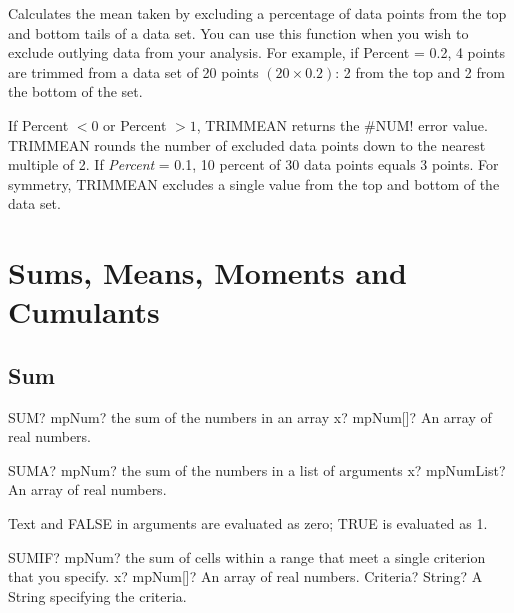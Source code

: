 Calculates the mean taken by excluding a percentage of data points from the top and bottom tails of a data set. You can use this function when you wish to exclude outlying data from your analysis. For example, if \textsf{Percent} = 0.2, 4 points are trimmed from a data set of 20 points $(20 \times 0.2)$: 2 from the top and 2 from the bottom of the set.

\vspace{0.3cm}
If \textsf{Percent} $< 0$ or \textsf{Percent} $> 1$, \textsf{TRIMMEAN} returns the \#NUM! error value.
\textsf{TRIMMEAN} rounds the number of excluded data points down to the nearest multiple of 2. If \textsf{\textsl{Percent}} = 0.1, 10 percent of 30 data points equals 3 points. For symmetry, \textsf{TRIMMEAN} excludes a single value from the top and bottom of the data set.







\newpage
\section{Sums, Means, Moments and Cumulants}
\label{MomentsAndCumulants}

\subsection{Sum}

\begin{mpFunctionsExtract}
	\mpWorksheetFunctionOneNotImplemented
	{SUM? mpNum? the sum of the numbers in an array}
	{x? mpNum[]? An array of real numbers.}
\end{mpFunctionsExtract}


\vspace{0.6cm}
\begin{mpFunctionsExtract}
	\mpWorksheetFunctionOneNotImplemented
	{SUMA? mpNum? the sum of the numbers in a list of arguments}
	{x? mpNumList? An array of real numbers.}
\end{mpFunctionsExtract}

\vspace{0.3cm}
Text and FALSE in arguments are evaluated as zero; TRUE is evaluated as 1.


\vspace{0.6cm}
\begin{mpFunctionsExtract}
	\mpWorksheetFunctionTwoNotImplemented
	{SUMIF? mpNum? the sum of cells within a range that meet a single criterion that you specify.}
	{x? mpNum[]? An array of real numbers.}
	{Criteria? String? A String specifying the criteria.}
\end{mpFunctionsExtract}

